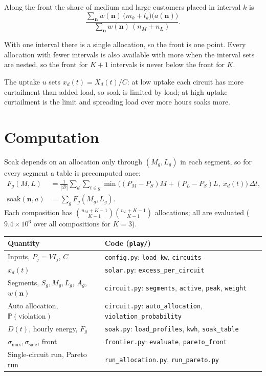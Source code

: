 \documentclass[11pt,a4paper]{article}
\newcommand{\Prob}{\mathbb{P}}
\begin{document}
Along the front the share of medium and large customers placed in interval \(k\) is
\begin{equation}
  \frac{\sum_{\boldsymbol n} w(\boldsymbol n)\,\bigl(m_k+l_k\bigr)\bigl(a(\boldsymbol n)\bigr)}
       {\sum_{\boldsymbol n} w(\boldsymbol n)\,(n_M+n_L)} .
\end{equation}

With one interval there is a single allocation, so the front is one point.
Every allocation with fewer intervals is also available with more when the
interval sets are nested, so the front for \(K+1\) intervals is never below
the front for \(K\).

The uptake \(u\) sets \(x_d(t)=X_d(t)/C\): at low uptake each circuit has more
curtailment than added load, so soak is limited by load; at high uptake
curtailment is the limit and spreading load over more hours soaks more.

\section{Computation}
Soak depends on an allocation only through \((M_g,L_g)\) in each segment, so for every
segment a table is precomputed once:
\begin{align}
  F_g(M,L)&=\frac{1}{|\mathcal D|}\sum_{d}\sum_{t\in g}
    \min\bigl((P_M-P_S)M+(P_L-P_S)L,\ x_d(t)\bigr)\,\Delta t,\\
  \text{soak}(\boldsymbol n,a)&=\sum_g F_g(M_g,L_g).
\end{align}
Each composition has
\(\binom{n_M+K-1}{K-1}\binom{n_L+K-1}{K-1}\) allocations; all are evaluated
(\(9.4\times10^6\) over all compositions for \(K=3\)).

\begin{center}
\small
\begin{tabular}{ll}
\toprule
Quantity & Code (\texttt{play/})\\
\midrule
Inputs, \(P_j=VI_j\), \(C\) & \texttt{config.py}: \texttt{load\_kw}, \texttt{circuits}\\
\(x_d(t)\) & \texttt{solar.py}: \texttt{excess\_per\_circuit}\\
Segments, \(S_g,M_g,L_g\), \(A_g\), \(w(\boldsymbol n)\) & \texttt{circuit.py}: \texttt{segments}, \texttt{active}, \texttt{peak}, \texttt{weight}\\
Auto allocation, \(\Prob(\text{violation})\) & \texttt{circuit.py}: \texttt{auto\_allocation}, \texttt{violation\_probability}\\
\(D(t)\), hourly energy, \(F_g\) & \texttt{soak.py}: \texttt{load\_profiles}, \texttt{kwh}, \texttt{soak\_table}\\
\(\sigma_{\max},\sigma_{\mathrm{safe}}\), front & \texttt{frontier.py}: \texttt{evaluate}, \texttt{pareto\_front}\\
Single-circuit run, Pareto run & \texttt{run\_allocation.py}, \texttt{run\_pareto.py}\\
\bottomrule
\end{tabular}
\end{center}
\end{document}
